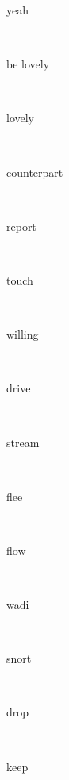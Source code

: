 \documentclass[a4paper]{article}
\begin{document}
\begin{multicols}{4}
\begin{multicols}{4}
\begin{multicols}{5}
{\hebrewfont{}} \begin{english}yeah\end{english}\\
{\hebrewfont{}} \begin{english}be lovely\end{english}\\
{\hebrewfont{}} \begin{english}lovely\end{english}\\
{\hebrewfont{}} \begin{english}counterpart\end{english}\\
{\hebrewfont{}} \begin{english}report\end{english}\\
{\hebrewfont{}} \begin{english}touch\end{english}\\
{\hebrewfont{}} \begin{english}willing\end{english}\\
{\hebrewfont{}} \begin{english}drive\end{english}\\
{\hebrewfont{}} \begin{english}stream\end{english}\\
{\hebrewfont{}} \begin{english}flee\end{english}\\
{\hebrewfont{}} \begin{english}flow\end{english}\\
{\hebrewfont{}} \begin{english}wadi\end{english}\\
{\hebrewfont{}} \begin{english}snort\end{english}\\
{\hebrewfont{}} \begin{english}drop\end{english}\\
{\hebrewfont{}} \begin{english}keep\end{english}\\

\end{multicols}
\end{multicols}
\end{multicols}
\end{document}
